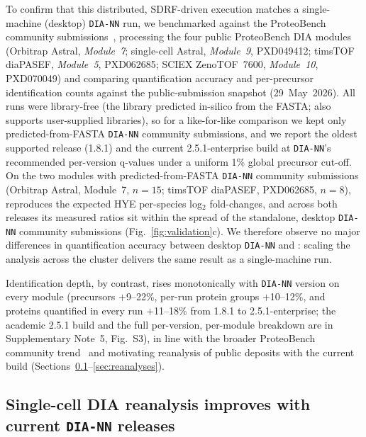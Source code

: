 \documentclass[preprint,12pt]{elsarticle}
\begin{document}
To confirm that this distributed, SDRF-driven execution matches a single-machine (desktop) \texttt{DIA-NN} run, we benchmarked \quantmsdiann{} against the ProteoBench community submissions~\cite{devreese2025proteobench}, processing the four public ProteoBench DIA modules (Orbitrap Astral, \emph{Module~7}; single-cell Astral, \emph{Module~9}, PXD049412; timsTOF diaPASEF, \emph{Module~5}, PXD062685; SCIEX ZenoTOF~7600, \emph{Module~10}, PXD070049) and comparing quantification accuracy and per-precursor identification counts against the public-submission snapshot (29~May~2026). All runs were library-free (the library predicted in-silico from the FASTA; \quantmsdiann{} also supports user-supplied libraries), so for a like-for-like comparison we kept only predicted-from-FASTA \texttt{DIA-NN} community submissions, and we report the oldest supported release (1.8.1) and the current 2.5.1-enterprise build at \texttt{DIA-NN}'s recommended per-version q-values under a uniform 1\% global precursor cut-off. On the two modules with predicted-from-FASTA \texttt{DIA-NN} community submissions (Orbitrap Astral, Module~7, $n=15$; timsTOF diaPASEF, PXD062685, $n=8$), \quantmsdiann{} reproduces the expected HYE per-species log$_2$ fold-changes, and across both releases its measured ratios sit within the spread of the standalone, desktop \texttt{DIA-NN} community submissions (Fig.~\ref{fig:validation}c). We therefore observe no major differences in quantification accuracy between desktop \texttt{DIA-NN} and \quantmsdiann{}: scaling the analysis across the cluster delivers the same result as a single-machine run.

Identification depth, by contrast, rises monotonically with \texttt{DIA-NN} version on every module (precursors $+$9--22\%, per-run protein groups $+$10--12\%, and proteins quantified in every run $+$11--18\% from 1.8.1 to 2.5.1-enterprise; the academic 2.5.1 build and the full per-version, per-module breakdown are in Supplementary Note~5, Fig.~S3), in line with the broader ProteoBench community trend~\cite{devreese2025proteobench} and motivating reanalysis of public deposits with the current build (Sections~\ref{sec:single-cell}--\ref{sec:reanalyses}).

\subsection{Single-cell DIA reanalysis improves with current \texttt{DIA-NN} releases}
\label{sec:single-cell}
\end{document}
